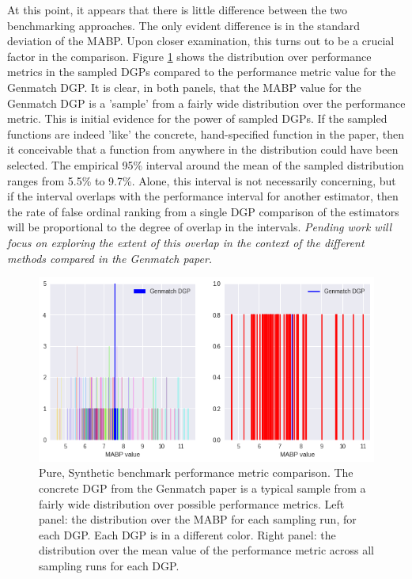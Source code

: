 \documentclass[../main.tex]{subfiles}
\begin{document}
At this point, it appears that there is little difference between the two benchmarking approaches. The only evident difference is in the standard deviation of the MABP. Upon closer examination, this turns out to be a crucial factor in the comparison. Figure \ref{fig:benchmark-validation-pure-synth-1} shows the distribution over performance metrics in the sampled DGPs compared to the performance metric value for the Genmatch DGP. It is clear, in both panels, that the MABP value for the Genmatch DGP is a 'sample' from a fairly wide distribution over the performance metric. This is initial evidence for the power of sampled DGPs. If the sampled functions are indeed 'like' the concrete, hand-specified function in the paper, then it conceivable that a function from anywhere in the distribution could have been selected. The empirical 95\% interval around the mean of the sampled distribution ranges from 5.5\% to 9.7\%. Alone, this interval is not necessarily concerning, but if the interval overlaps with the performance interval for another estimator, then the rate of false ordinal ranking from a single DGP comparison of the estimators will be proportional to the degree of overlap in the intervals. \textit{Pending work will focus on exploring the extent of this overlap in the context of the different methods compared in the Genmatch paper.}

\begin{figure}[ht!]
    \centering
    \includegraphics[width=1\linewidth]{figures/ch7-benchmark-pure-synth-1.png}
    \caption{Pure, Synthetic benchmark performance metric comparison. The concrete DGP from the Genmatch paper is a typical sample from a fairly wide distribution over possible performance metrics. Left panel: the distribution over the MABP for each sampling run, for each DGP. Each DGP is in a different color. Right panel: the distribution over the mean value of the performance metric across all sampling runs for each DGP.}
    \label{fig:benchmark-validation-pure-synth-1}
\end{figure}
\FloatBarrier
\end{document}
